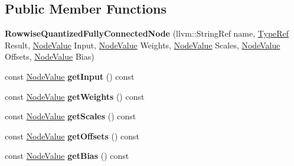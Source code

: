 \subsection*{Public Member Functions}
\begin{DoxyCompactItemize}
\item 
\mbox{\label{classglow_1_1_rowwise_quantized_fully_connected_node_a8e7fe4fc4a532581396bea6efc8da8bf}} 
{\bfseries Rowwise\+Quantized\+Fully\+Connected\+Node} (llvm\+::\+String\+Ref name, \hyperlink{structglow_1_1_type}{Type\+Ref} Result, \hyperlink{structglow_1_1_node_value}{Node\+Value} Input, \hyperlink{structglow_1_1_node_value}{Node\+Value} Weights, \hyperlink{structglow_1_1_node_value}{Node\+Value} Scales, \hyperlink{structglow_1_1_node_value}{Node\+Value} Offsets, \hyperlink{structglow_1_1_node_value}{Node\+Value} Bias)
\item 
\mbox{\label{classglow_1_1_rowwise_quantized_fully_connected_node_a5f15ca7634b38234d21e9e6738ec46ad}} 
const \hyperlink{structglow_1_1_node_value}{Node\+Value} {\bfseries get\+Input} () const
\item 
\mbox{\label{classglow_1_1_rowwise_quantized_fully_connected_node_a6d20b08280dee2b3ae5418afcaae38ae}} 
const \hyperlink{structglow_1_1_node_value}{Node\+Value} {\bfseries get\+Weights} () const
\item 
\mbox{\label{classglow_1_1_rowwise_quantized_fully_connected_node_aaa305e8fbd75c6505b3d6eea5e07ff4c}} 
const \hyperlink{structglow_1_1_node_value}{Node\+Value} {\bfseries get\+Scales} () const
\item 
\mbox{\label{classglow_1_1_rowwise_quantized_fully_connected_node_ac7b610c17ca5b0abb436bd126eb92728}} 
const \hyperlink{structglow_1_1_node_value}{Node\+Value} {\bfseries get\+Offsets} () const
\item 
\mbox{\label{classglow_1_1_rowwise_quantized_fully_connected_node_a00bad6556449f4899d11c017288c3814}} 
const \hyperlink{structglow_1_1_node_value}{Node\+Value} {\bfseries get\+Bias} () const

\end{DoxyCompactItemize}
